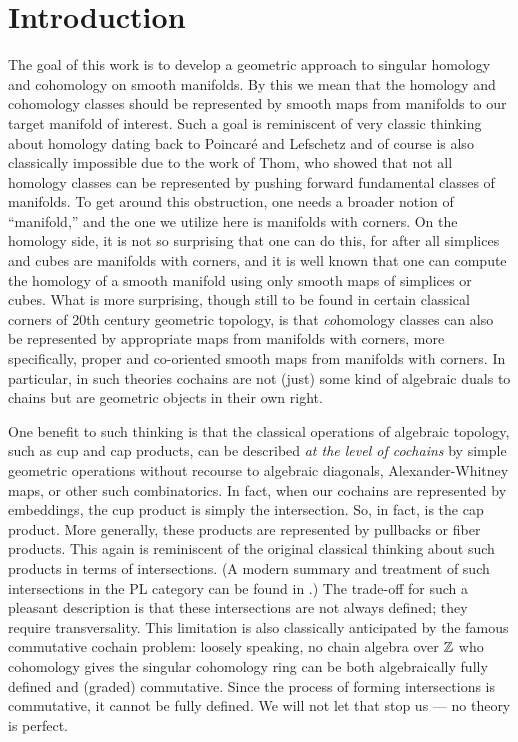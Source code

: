 
\section{Introduction}\label{intro}

The goal of this work is to develop a geometric approach to singular homology and cohomology on smooth manifolds.
By this we mean that the homology and cohomology classes should be represented by smooth maps from manifolds to our target manifold of interest.
Such a goal is reminiscent of very classic thinking about homology dating back to Poincar\'e and Lefschetz and of course is also classically impossible due to the work of Thom, who showed that not all homology classes can be represented by pushing forward fundamental classes of manifolds.
To get around this obstruction, one needs a broader notion of ``manifold,'' and the one we utilize here is manifolds with corners.
On the homology side, it is not so surprising that one can do this, for after all simplices and cubes are manifolds with corners, and it is well known that one can compute the homology of a smooth manifold using only smooth maps of simplices or cubes.
What is more surprising, though still to be found in certain classical corners of 20th century geometric topology, is that {\it co}homology classes can also be represented by appropriate maps from manifolds with corners, more specifically, proper and co-oriented smooth maps from manifolds with corners.
In particular, in such theories cochains are not (just) some kind of algebraic duals to chains but are geometric objects in their own right.

One benefit to such thinking is that the classical operations of algebraic topology, such as cup and cap products, can be described {\it at the level of cochains} by simple geometric operations without recourse to algebraic diagonals, Alexander-Whitney maps, or other such combinatorics.
In fact, when our cochains are represented by embeddings, the cup product is simply the intersection.
So, in fact, is the cap product.
More generally, these products are represented by pullbacks or fiber products.
This again is reminiscent of the original classical thinking about such products in terms of intersections.
(A modern summary and treatment of such intersections in the PL category can be found in \cite{McC06}.)
The trade-off for such a pleasant description is that these intersections are not always defined; they require transversality.
This limitation is also classically anticipated by the famous commutative cochain problem: loosely speaking, no chain algebra over $\mathbb{Z}$ who cohomology gives the singular cohomology ring can be both algebraically fully defined and (graded) commutative.
Since the process of forming intersections is commutative, it cannot be fully defined.
We will not let that stop us --- no theory is perfect.

